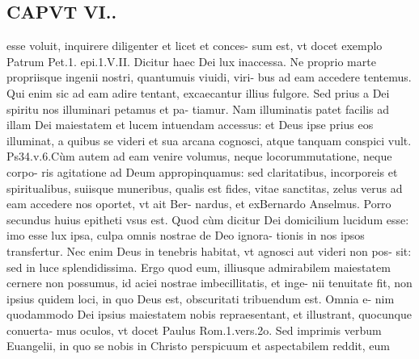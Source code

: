 \documentclass{article}
\begin{document}
\begin{pages}
\section*{CAPVT  VI.. }
\marginpar{[ p.489 ]}\pstart esse voluit, inquirere diligenter et licet et conces- sum est, vt docet exemplo Patrum Pet.1. epi.1.V.II. Dicitur haec Dei lux inaccessa. Ne proprio marte propriisque  ingenii nostri, quantumuis viuidi, viri- bus ad eam accedere tentemus. Qui enim sic ad eam adire tentant, excaecantur illius fulgore. Sed prius a Dei spiritu nos illuminari petamus et pa- tiamur. Nam illuminatis patet facilis ad illam Dei maiestatem et lucem intuendam accessus: et Deus ipse prius eos illuminat, a quibus se videri et sua arcana cognosci, atque tanquam conspici vult. Ps34.v.6.Cùm autem ad eam venire volumus, neque  locorummutatione, neque corpo- ris agitatione ad Deum appropinquamus: sed claritatibus, incorporeis et spiritualibus, suiisque muneribus, qualis est fides, vitae sanctitas, zelus verus ad eam accedere nos oportet, vt ait Ber- nardus, et exBernardo Anselmus.  \pend\pstart Porro secundus huius epitheti vsus est. Quod cùm dicitur Dei domicilium lucidum esse: imo esse lux ipsa, culpa omnis nostrae de Deo ignora- tionis in nos ipsos transfertur. Nec enim Deus in tenebris habitat, vt agnosci aut videri non pos- sit: sed in luce splendidissima. Ergo quod eum, illiusque admirabilem maiestatem cernere non possumus, id aciei nostrae imbecillitatis, et inge- nii tenuitate fit, non ipsius quidem loci, in quo Deus est, obscuritati tribuendum est. Omnia e- nim quodammodo Dei ipsius maiestatem nobis repraesentant, et illustrant, quocunque conuerta- mus oculos, vt docet Paulus Rom.1.vers.2o. Sed imprimis verbum Euangelii, in quo se nobis in Christo perspicuum et aspectabilem reddit, eum  \pend

\end{pages}
\end{document}
